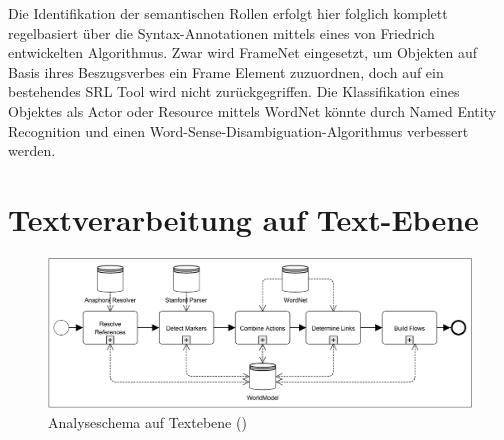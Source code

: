 \par
Die Identifikation der semantischen Rollen erfolgt hier folglich komplett regelbasiert über die Syntax-Annotationen mittels eines von Friedrich entwickelten Algorithmus. Zwar wird FrameNet eingesetzt, um Objekten auf Basis ihres Beszugsverbes ein Frame Element zuzuordnen, doch auf ein bestehendes \ac{SRL} Tool wird nicht zurückgegriffen. Die Klassifikation eines Objektes als Actor oder Resource mittels WordNet könnte durch Named Entity Recognition und einen Word-Sense-Disambiguation-Algorithmus verbessert werden.

\section{Textverarbeitung auf Text-Ebene}
\label{subsec:TextLevel}

\begin{figure}[h]
\begin{center}
\includegraphics[keepaspectratio=true, width=\textwidth]{pictures/textLevel.png}
\caption{Analyseschema auf Textebene (\cite[vgl.][7]{FRIEDRICH2})}
\label{fig:TLEVEL}
\end{center}\end{figure}

